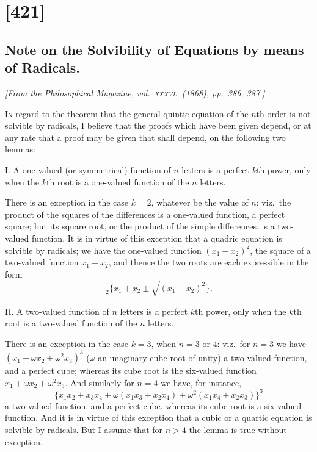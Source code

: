 \documentclass[11pt,a4paper]{article}
\begin{document}
\section*{[421]}
\subsection*{Note on the Solvibility of Equations by means of Radicals.}

\begin{center}
\textit{[From the Philosophical Magazine, vol.~\textsc{xxxvi}.\ (1868), pp.~386, 387.]}
\end{center}

\textsc{In} regard to the theorem that the general quintic equation of the $n$th
order is not solvible by radicals, I believe that the proofs which have been
given depend, or at any rate that a proof may be given that shall depend, on
the following two lemmas:

\medskip\noindent
\textsc{I.}  A one-valued (or symmetrical) function of $n$ letters is a perfect
$k$th power, only when the $k$th root is a one-valued function of the $n$
letters.

There is an exception in the case $k = 2$, whatever be the value of $n$: viz.\
the product of the squares of the differences is a one-valued function, a
perfect square; but its square root, or the product of the simple differences,
is a two-valued function.  It is in virtue of this exception that a quadric
equation is solvible by radicals; we have the one-valued function
$(x_1 - x_2)^2$, the square of a two-valued function $x_1 - x_2$, and thence
the two roots are each expressible in the form
\[
\tfrac{1}{2}\bigl\{x_1 + x_2 \pm \sqrt{(x_1 - x_2)^2}\bigr\}.
\]

\medskip\noindent
\textsc{II.}  A two-valued function of $n$ letters is a perfect $k$th power,
only when the $k$th root is a two-valued function of the $n$ letters.

There is an exception in the case $k = 3$, when $n = 3$ or $4$: viz.\ for
$n = 3$ we have $(x_1 + \omega x_2 + \omega^2 x_3)^3$ ($\omega$ an imaginary cube
root of unity) a two-valued function, and a perfect cube; whereas its cube
root is the six-valued function $x_1 + \omega x_2 + \omega^2 x_3$.  And similarly
for $n = 4$ we have, for instance,
\[
\{ x_1 x_2 + x_3 x_4 + \omega(x_1 x_3 + x_2 x_4) + \omega^2(x_1 x_4 + x_2 x_3) \}^3
\]
a two-valued function, and a perfect cube, whereas its cube root is a
six-valued function.  And it is in virtue of this exception that a cubic or a
quartic equation is solvible by radicals.  But I assume that for $n > 4$ the
lemma is true without exception.
\end{document}
